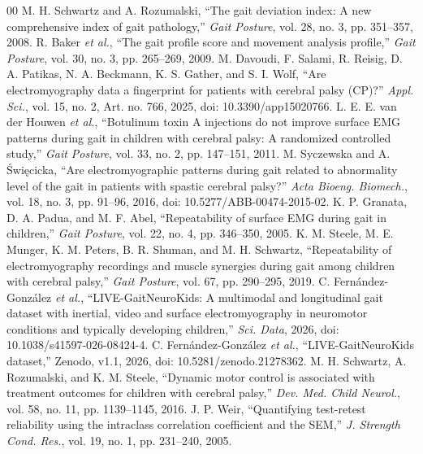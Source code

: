 \documentclass[conference]{IEEEtran}
\begin{document}
\begin{thebibliography}{00}
 M. H. Schwartz and A. Rozumalski, ``The gait deviation index: A new comprehensive index of gait pathology,'' \emph{Gait Posture}, vol. 28, no. 3, pp. 351--357, 2008.
 R. Baker \emph{et al.}, ``The gait profile score and movement analysis profile,'' \emph{Gait Posture}, vol. 30, no. 3, pp. 265--269, 2009.
 M. Davoudi, F. Salami, R. Reisig, D. A. Patikas, N. A. Beckmann, K. S. Gather, and S. I. Wolf, ``Are electromyography data a fingerprint for patients with cerebral palsy (CP)?'' \emph{Appl. Sci.}, vol. 15, no. 2, Art. no. 766, 2025, doi: 10.3390/app15020766.
 L. E. E. van der Houwen \emph{et al.}, ``Botulinum toxin A injections do not improve surface EMG patterns during gait in children with cerebral palsy: A randomized controlled study,'' \emph{Gait Posture}, vol. 33, no. 2, pp. 147--151, 2011.
 M. Syczewska and A. \'{S}wi\k{e}cicka, ``Are electromyographic patterns during gait related to abnormality level of the gait in patients with spastic cerebral palsy?'' \emph{Acta Bioeng. Biomech.}, vol. 18, no. 3, pp. 91--96, 2016, doi: 10.5277/ABB-00474-2015-02.
 K. P. Granata, D. A. Padua, and M. F. Abel, ``Repeatability of surface EMG during gait in children,'' \emph{Gait Posture}, vol. 22, no. 4, pp. 346--350, 2005.
 K. M. Steele, M. E. Munger, K. M. Peters, B. R. Shuman, and M. H. Schwartz, ``Repeatability of electromyography recordings and muscle synergies during gait among children with cerebral palsy,'' \emph{Gait Posture}, vol. 67, pp. 290--295, 2019.
 C. Fern\'{a}ndez-Gonz\'{a}lez \emph{et al.}, ``LIVE-GaitNeuroKids: A multimodal and longitudinal gait dataset with inertial, video and surface electromyography in neuromotor conditions and typically developing children,'' \emph{Sci. Data}, 2026, doi: 10.1038/s41597-026-08424-4.
 C. Fern\'{a}ndez-Gonz\'{a}lez \emph{et al.}, ``LIVE-GaitNeuroKids dataset,'' Zenodo, v1.1, 2026, doi: 10.5281/zenodo.21278362.
 M. H. Schwartz, A. Rozumalski, and K. M. Steele, ``Dynamic motor control is associated with treatment outcomes for children with cerebral palsy,'' \emph{Dev. Med. Child Neurol.}, vol. 58, no. 11, pp. 1139--1145, 2016.
 J. P. Weir, ``Quantifying test-retest reliability using the intraclass correlation coefficient and the SEM,'' \emph{J. Strength Cond. Res.}, vol. 19, no. 1, pp. 231--240, 2005.

\end{thebibliography}
\end{document}
